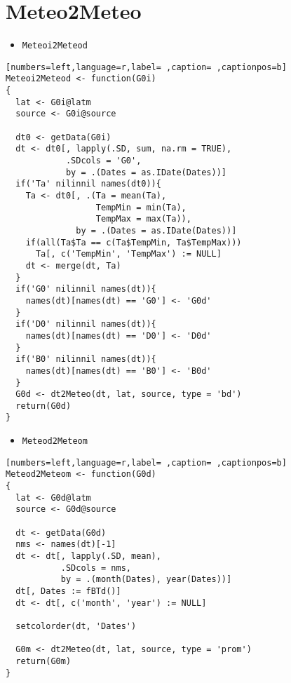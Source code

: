 \section{Meteo2Meteo}
\label{sec:orgcb98fad}
\begin{itemize}
\item \texttt{Meteoi2Meteod}
\end{itemize}
\begin{lstlisting}[numbers=left,language=r,label= ,caption= ,captionpos=b]
Meteoi2Meteod <- function(G0i)
{
  lat <- G0i@latm
  source <- G0i@source

  dt0 <- getData(G0i)
  dt <- dt0[, lapply(.SD, sum, na.rm = TRUE),
            .SDcols = 'G0',
            by = .(Dates = as.IDate(Dates))]
  if('Ta' nilinnil names(dt0)){
    Ta <- dt0[, .(Ta = mean(Ta),
                  TempMin = min(Ta),
                  TempMax = max(Ta)),
              by = .(Dates = as.IDate(Dates))]
    if(all(Ta$Ta == c(Ta$TempMin, Ta$TempMax)))
      Ta[, c('TempMin', 'TempMax') := NULL]
    dt <- merge(dt, Ta)
  }
  if('G0' nilinnil names(dt)){
    names(dt)[names(dt) == 'G0'] <- 'G0d'
  }
  if('D0' nilinnil names(dt)){
    names(dt)[names(dt) == 'D0'] <- 'D0d'
  }
  if('B0' nilinnil names(dt)){
    names(dt)[names(dt) == 'B0'] <- 'B0d'
  }
  G0d <- dt2Meteo(dt, lat, source, type = 'bd')
  return(G0d)
}
\end{lstlisting}
\begin{itemize}
\item \texttt{Meteod2Meteom}
\end{itemize}
\begin{lstlisting}[numbers=left,language=r,label= ,caption= ,captionpos=b]
Meteod2Meteom <- function(G0d)
{
  lat <- G0d@latm
  source <- G0d@source

  dt <- getData(G0d)
  nms <- names(dt)[-1]
  dt <- dt[, lapply(.SD, mean),
           .SDcols = nms,
           by = .(month(Dates), year(Dates))]
  dt[, Dates := fBTd()]
  dt <- dt[, c('month', 'year') := NULL]

  setcolorder(dt, 'Dates')

  G0m <- dt2Meteo(dt, lat, source, type = 'prom')
  return(G0m)
}
\end{lstlisting}
